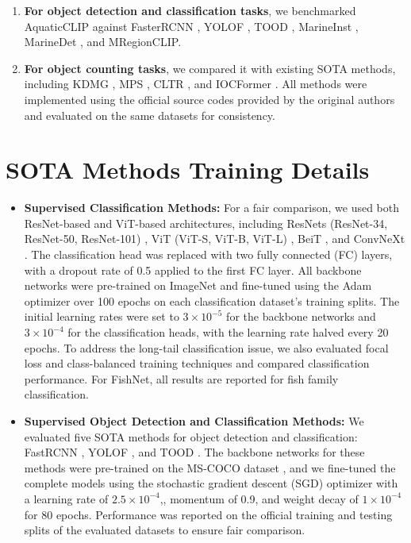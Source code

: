 \begin{enumerate}
\item \textbf{For object detection and classification tasks}, we benchmarked AquaticCLIP against FasterRCNN \cite{ren2016faster}, YOLOF \cite{chen2021you}, TOOD \cite{feng2021tood}, MarineInst \cite{ziqiang2024marineinst}, MarineDet \cite{haixin2023marinedet}, and MRegionCLIP.
\item \textbf{For object counting tasks}, we compared it with existing SOTA methods, including KDMG \cite{kdmg}, MPS \cite{mps}, CLTR \cite{cltr_liang2022end}, and IOCFormer \cite{sun2023indiscernible}. 
All methods were implemented using the official source codes provided by the original authors and evaluated on the same datasets for consistency.
\end{enumerate}



    
\section{SOTA Methods Training Details}
\label{sotadetails}
\begin{itemize}
    \item \textbf{Supervised Classification Methods:} For a fair comparison, we used both ResNet-based and ViT-based architectures, including ResNets (ResNet-34, ResNet-50, ResNet-101) \cite{he2016deep}, ViT (ViT-S, ViT-B, ViT-L) \cite{alexey2020image}, BeiT \cite{bao2021beit}, and ConvNeXt \cite{liu2022convnet}.
The classification head was replaced with two fully connected (FC) layers, with a dropout rate of 0.5 applied to the first FC layer.
All backbone networks were pre-trained on ImageNet and fine-tuned using the Adam optimizer over 100 epochs on each classification dataset's training splits. 
The initial learning rates were set to $3 \times 10^{-5}$ for the backbone networks and $3 \times 10^{-4}$ for the classification heads, with the learning rate halved every 20 epochs. 
To address the long-tail classification issue, we also evaluated focal loss \cite{lin2017focal} and class-balanced training \cite{cui2019class} techniques and compared classification performance. 
For FishNet, all results are reported for fish family classification.
\item \textbf{Supervised Object Detection and Classification Methods:} We evaluated five SOTA methods for object detection and classification: FastRCNN \cite{ren2016faster}, YOLOF \cite{chen2021you}, and TOOD \cite{feng2021tood}. The backbone networks for these methods were pre-trained on the MS-COCO dataset \cite{lin2014microsoft}, and we fine-tuned the complete models using the stochastic gradient descent (SGD) optimizer with a learning rate of $2.5 \times 10^{-4}$,, momentum of 0.9, and weight decay of $1 \times 10^{-4}$ for 80 epochs. 
Performance was reported on the official training and testing splits of the evaluated datasets to ensure fair comparison.

\end{itemize}





